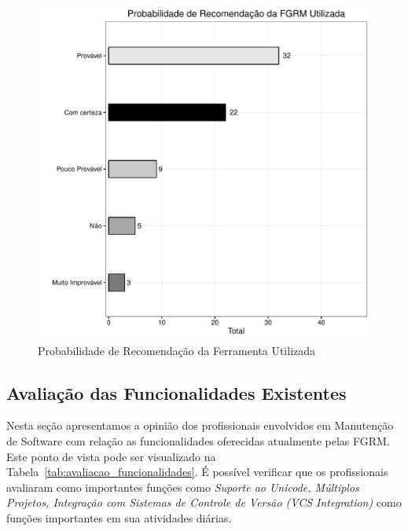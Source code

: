 \begin{figure}[htpb]
	\centering
	\includegraphics[width=0.8\linewidth]{./chapter-pesquisa-com-profissionais/img/grafico_melhorias_fgrm_probabilidade_recomentacao.pdf}
	\caption{Probabilidade de Recomendação da Ferramenta Utilizada}
\label{fig:grafico_melhorias_fgrm_probabilidade_recomentacao}
\end{figure}

\subsection{Avaliação das Funcionalidades Existentes}
\label{sub:avaliação_das_funcionalidades_existentes}

Nesta seção apresentamos a opinião dos profissionais envolvidos em Manutenção de Software com relação as
funcionalidades oferecidas atualmente pelas FGRM\@. Este ponto de vista pode ser
visualizado na Tabela~\ref{tab:avaliacao_funcionalidades}. É possível verificar
que os profissionais avaliaram como importantes funções como \textit{Suporte ao
Unicode, Múltiplos Projetos, Integração com Sistemas de Controle de Versão (VCS
Integration)} como  funções importantes em sua atividades diárias. 

